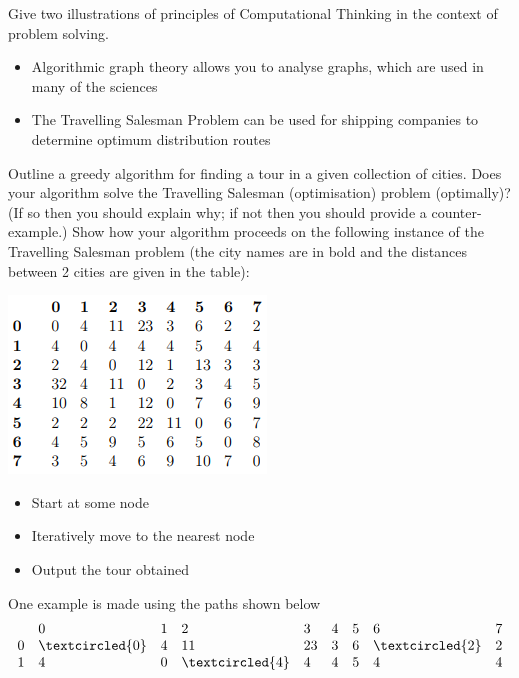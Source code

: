\documentclass{exam}
\begin{document}
\begin{questions}
\question[2]Give two illustrations of principles of Computational Thinking in the
context of problem solving.
\begin{solution}[2in]
	\begin{itemize}
		\item Algorithmic graph theory allows you to analyse graphs, which are used in many of the sciences
		\item The Travelling Salesman Problem can be used for shipping companies to determine optimum distribution routes
	\end{itemize}
\end{solution}
\newpage
\question[10]Outline a greedy algorithm for finding a tour in a given collection of
cities. Does your algorithm solve the Travelling Salesman (optimisation)
problem (optimally)? (If so then you should explain why; if not
then you should provide a counter-example.) Show how your algorithm
proceeds on the following instance of the Travelling Salesman problem
(the city names are in bold and the distances between 2 cities are given
in the table):
\begin{center}
	\includegraphics[scale=0.7]{tsptable}
\end{center}
\begin{solution}[2in]
	\begin{itemize}
		\item Start at some node
		\item Iteratively move to the nearest node
		\item Output the tour obtained
	\end{itemize}
One example is made using the paths shown below
	$$\begin{array} { l l l l l l l l l } { } & 
	{ 0 } & { 1 } & { 2 } & { 3 } & { 4 } & { 5 } & { 6 } & { 7 } \\
	 { 0 } & { \textcircled{0} } & { 4 } & { 11 } & { 23 } & { 3 } & { 6 } & { \textcircled{2} } & { 2 } \\
	  { 1 } & { 4 } & { 0 } & { \textcircled{4} } & { 4 } & { 4 } & { 5 } & { 4 } & { 4 } \\ 

\end{array}$$
\end{solution}
\end{questions}
\end{document}
